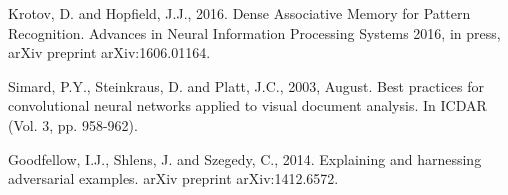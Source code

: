 \documentclass[12pt]{article} %
\begin{document}
\begin{thebibliography}{99}
 Krotov, D. and Hopfield, J.J., 2016. Dense Associative Memory for Pattern Recognition. Advances in Neural Information Processing Systems 2016, in press, arXiv preprint arXiv:1606.01164. 

 Simard, P.Y., Steinkraus, D. and Platt, J.C., 2003, August. Best practices for convolutional neural networks applied to visual document analysis. In ICDAR (Vol. 3, pp. 958-962).


 Goodfellow, I.J., Shlens, J. and Szegedy, C., 2014. Explaining and harnessing adversarial examples. arXiv preprint arXiv:1412.6572.


\end{thebibliography}



\end{document}
